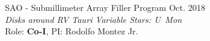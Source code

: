 \documentclass[letter,12pt]{article}
\begin{document}
\begin{etaremune}


\item SAO - Submillimeter Array Filler Program \hfill Oct. 2018 \\
\textit{Disks around RV Tauri Variable Stars: U~Mon} \\ Role: \textbf{Co-I}, PI: Rodolfo Montez Jr.



\end{etaremune}

\end{document}
